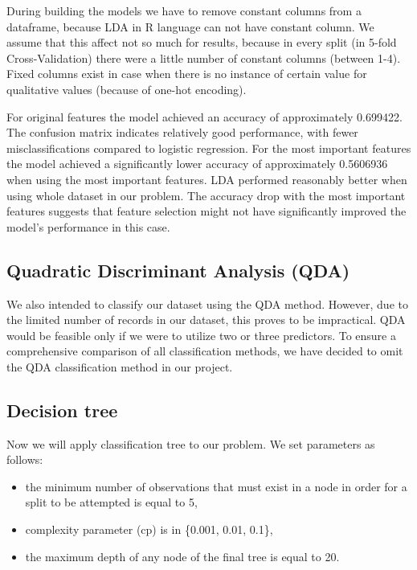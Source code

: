 \documentclass[11pt,a4paper]{article}\usepackage[]{graphicx}\usepackage[]{xcolor}
\begin{document}
During building the models we have to remove constant columns from a dataframe, because LDA in R language can not have constant column. We assume that this affect not so much for results, because in every split (in 5-fold Cross-Validation) there were a little number of constant columns (between 1-4). Fixed columns exist in case when there is no instance of certain value for qualitative values (because of one-hot encoding).



For original features the model achieved an accuracy of approximately 0.699422.
The confusion matrix indicates relatively good performance, with fewer misclassifications compared to logistic regression.
For the most important features the model achieved a significantly lower accuracy of approximately 0.5606936 when using the most important features.
LDA performed reasonably better when using whole dataset in our problem.
The accuracy drop with the most important features suggests that feature selection might not have significantly improved the model's performance in this case.


	
	\subsection{Quadratic Discriminant Analysis (QDA)}
We also intended to classify our dataset using the QDA method. However, due to the limited number of records in our dataset, this proves to be impractical. QDA would be feasible only if we were to utilize two or three predictors. To ensure a comprehensive comparison of all classification methods, we have decided to omit  the QDA classification method in our project.
	\subsection{Decision tree}
	
	Now we will apply classification tree to our problem. We set parameters as follows:
	\begin{itemize}
	\item the minimum number of observations that must exist in a node in order for a split to be attempted is equal to 5,
	\item complexity parameter (cp) is in \{0.001, 0.01, 0.1\},
	\item the maximum depth of any node of the final tree is equal to 20.
	\end{itemize}
	
\end{document}
